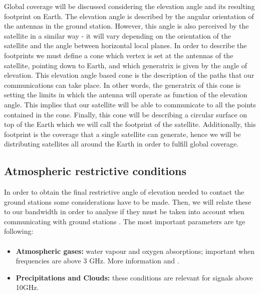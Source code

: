 Global coverage will be discussed considering the elevation angle and its resulting footprint on Earth. The elevation angle is described by the angular orientation of the antennas in the ground station. However, this angle is also perceived by the satellite in a similar way - it will vary depending on the orientation of the satellite and the angle between horizontal local planes. In order to describe the footprints we must define a cone which vertex is set at the antennas of the satellite, pointing down to Earth, and which generatrix is given by the angle of elevation. This elevation angle based cone is the description of the paths that our communications can take place. In other words, the generatrix of this cone is setting the limits in which the antenna will operate as function of the elevation angle. This implies that our satellite will be able to communicate to all the points contained in the cone. Finally, this cone will be describing a circular surface on top of the Earth which we will call the footprint of the satellite. Additionally, this footprint is the coverage that a single satellite can generate, hence we will be distributing satellites all around the Earth in order to fulfill global coverage. 



\subsection{Atmospheric restrictive conditions}
In order to obtain the final restrictive angle of elevation needed to contact the ground stations some considerations have to be made. Then, we will relate these to our bandwidth in order to analyse if they must be taken into account when communicating with ground stations \cite{Gomez2013}. The most important parameters are tge following:
\paragraph{    }

\begin{itemize}



\item\textbf{ Atmospheric gases: }water vapour and oxygen absorptions; important when frequencies are above 3 GHz. More information \cite{Zubair2011} and \cite{Luini2015}.\\

\item\textbf{ Precipitations and Clouds: }these conditions are relevant for signals above 10GHz. \\


\end{itemize}
